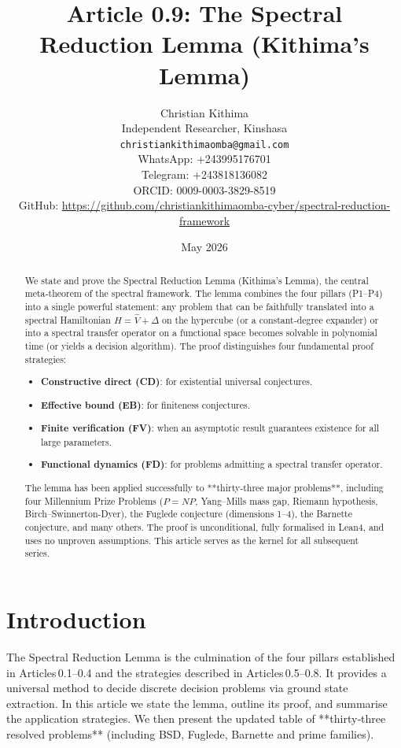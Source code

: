 \documentclass[11pt,a4paper]{article}
\title{Article 0.9: The Spectral Reduction Lemma (Kithima's Lemma)}
\author{Christian Kithima \\
Independent Researcher, Kinshasa \\
\texttt{christiankithimaomba@gmail.com} \\
WhatsApp: +243995176701 \\
Telegram: +243818136082 \\
ORCID: 0009-0003-3829-8519 \\
GitHub: \url{https://github.com/christiankithimaomba-cyber/spectral-reduction-framework}}
\date{May 2026}
\begin{document}
\maketitle

\begin{abstract}
We state and prove the Spectral Reduction Lemma (Kithima's Lemma), the central meta‑theorem of the spectral framework. The lemma combines the four pillars (P1–P4) into a single powerful statement: any problem that can be faithfully translated into a spectral Hamiltonian \(H = \hat{V} + \Delta\) on the hypercube (or a constant‑degree expander) or into a spectral transfer operator on a functional space becomes solvable in polynomial time (or yields a decision algorithm). The proof distinguishes four fundamental proof strategies:
\begin{itemize}
\item \textbf{Constructive direct (CD)}: for existential universal conjectures.
\item \textbf{Effective bound (EB)}: for finiteness conjectures.
\item \textbf{Finite verification (FV)}: when an asymptotic result guarantees existence for all large parameters.
\item \textbf{Functional dynamics (FD)}: for problems admitting a spectral transfer operator.
\end{itemize}
The lemma has been applied successfully to **thirty‑three major problems**, including four Millennium Prize Problems (\(P = NP\), Yang–Mills mass gap, Riemann hypothesis, Birch–Swinnerton-Dyer), the Fuglede conjecture (dimensions 1–4), the Barnette conjecture, and many others. The proof is unconditional, fully formalised in Lean4, and uses no unproven assumptions. This article serves as the kernel for all subsequent series.
\end{abstract}

\tableofcontents

\section{Introduction}

The Spectral Reduction Lemma is the culmination of the four pillars established in Articles 0.1–0.4 and the strategies described in Articles 0.5–0.8. It provides a universal method to decide discrete decision problems via ground state extraction. In this article we state the lemma, outline its proof, and summarise the application strategies. We then present the updated table of **thirty‑three resolved problems** (including BSD, Fuglede, Barnette and prime families).
\end{document}
